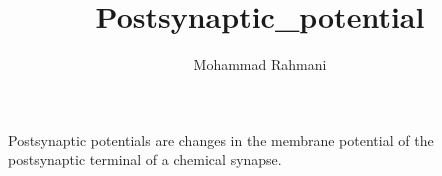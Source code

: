 \documentclass[a4paper]{article}
\title{Postsynaptic_potential}
\date{}
\author{Mohammad Rahmani}
\begin{document}
    \maketitle
    Postsynaptic potentials are changes in the membrane potential of the postsynaptic terminal of a chemical synapse.
    
    
\end{document}
